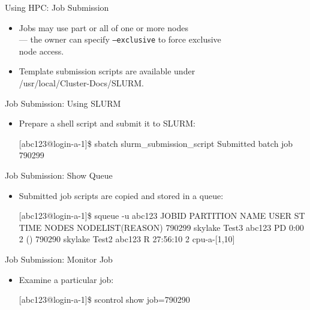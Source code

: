 \begin{frame}{Using HPC: Job Submission}
\begin{itemize}
\item{Jobs may use \alert{part} or \alert{all} of one or more nodes\hfill\\
\qquad --- the owner can specify \mbox{\tt --exclusive} to force exclusive\hfill\\\qquad\hphantom{---} node access.}
\item{Template submission scripts are available under\hfill\\
\qquad \alert{/usr/local/Cluster-Docs/SLURM}.}
\end{itemize}
\end{frame}

\begin{frame}[fragile]{Job Submission: Using SLURM}
\begin{itemize}
\item{Prepare a shell script and submit it to SLURM:}
\begin{semiverbatim}
\scriptsize
[abc123@login-a-1]\$ sbatch slurm_submission_script
Submitted batch job {\color{red}790299}
\end{semiverbatim}
\end{itemize}
\end{frame}

\begin{frame}[fragile]{Job Submission: Show Queue}
\begin{itemize}
\item{Submitted job scripts are copied and stored in a queue:}
\begin{semiverbatim}
\tiny
[abc123@login-a-1]\$ squeue -u abc123
             JOBID PARTITION     NAME     USER ST       TIME  NODES NODELIST(REASON)
            {\color{red}790299}   skylake     Test3  abc123 PD       0:00      2 ()
            790290   skylake     Test2  abc123  R   27:56:10      2 cpu-a-[1,10]
\end{semiverbatim}
\end{itemize}
\end{frame}

\begin{frame}[fragile]{Job Submission: Monitor Job}
\begin{itemize}
\item{Examine a particular job:}
\begin{semiverbatim}
\scriptsize
[abc123@login-a-1]\$ scontrol show job={\color{red}790290}
\end{semiverbatim}
\end{itemize}
\end{frame}

